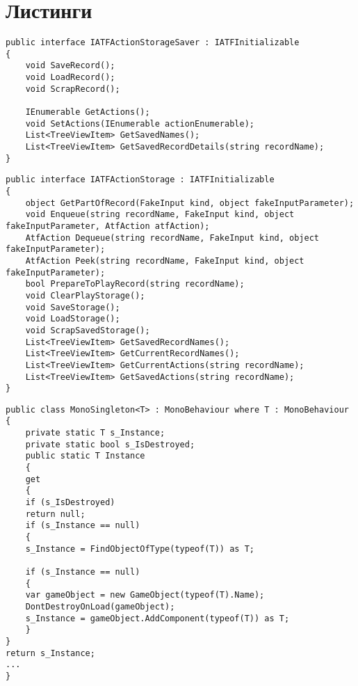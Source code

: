 \chapter{Листинги}
\begin{lstlisting}[caption={Интерфейс модуля загрузчика хранилища записей},label=iSaver]
public interface IATFActionStorageSaver : IATFInitializable
{
	void SaveRecord();
	void LoadRecord();
	void ScrapRecord();
	
	IEnumerable GetActions();
	void SetActions(IEnumerable actionEnumerable);
	List<TreeViewItem> GetSavedNames();
	List<TreeViewItem> GetSavedRecordDetails(string recordName);
}
\end{lstlisting}

\begin{lstlisting}[caption={Интерфейс модуля хранилища записей},label=iStorage]
public interface IATFActionStorage : IATFInitializable
{
	object GetPartOfRecord(FakeInput kind, object fakeInputParameter);
	void Enqueue(string recordName, FakeInput kind, object fakeInputParameter, AtfAction atfAction);
	AtfAction Dequeue(string recordName, FakeInput kind, object fakeInputParameter);
	AtfAction Peek(string recordName, FakeInput kind, object fakeInputParameter);
	bool PrepareToPlayRecord(string recordName);
	void ClearPlayStorage();
	void SaveStorage();
	void LoadStorage();
	void ScrapSavedStorage();
	List<TreeViewItem> GetSavedRecordNames();
	List<TreeViewItem> GetCurrentRecordNames();
	List<TreeViewItem> GetCurrentActions(string recordName);
	List<TreeViewItem> GetSavedActions(string recordName);
}
\end{lstlisting}

\begin{lstlisting}[caption={Бизнес-логика MonoSingleton<T>},label=monoSingleton]
public class MonoSingleton<T> : MonoBehaviour where T : MonoBehaviour
{
	private static T s_Instance;
	private static bool s_IsDestroyed;
	public static T Instance
	{
	get
	{
	if (s_IsDestroyed)
	return null;
	if (s_Instance == null)
	{
	s_Instance = FindObjectOfType(typeof(T)) as T;
	
	if (s_Instance == null)
	{
	var gameObject = new GameObject(typeof(T).Name); 
	DontDestroyOnLoad(gameObject);
	s_Instance = gameObject.AddComponent(typeof(T)) as T;
	}
}
return s_Instance;
...
}
\end{lstlisting}

